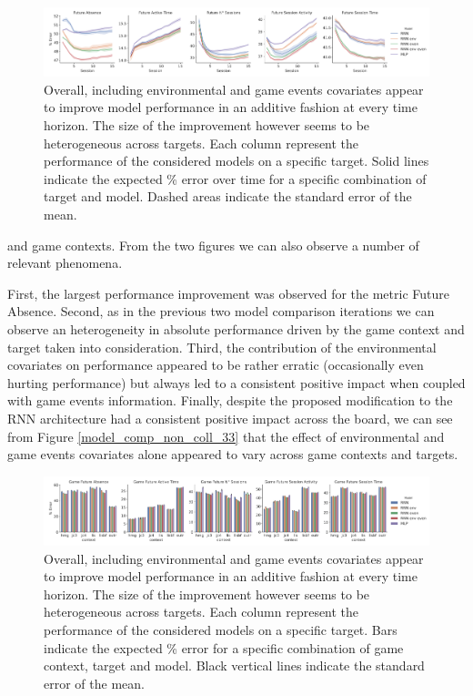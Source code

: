 \begin{figure}[h]
\centering
\includegraphics[width=\textwidth]{images/chapter_3/models_comparison_collapsed_game_33.png}
\caption[\textbf{Model comparison collapsing over game context}]{ Overall, including environmental and game events covariates appear to improve model performance in an additive fashion at every time horizon. The size of the improvement however seems to be heterogeneous across targets. Each column represent the performance of the considered models on a specific target. Solid lines indicate the expected \% error over time for a specific combination of target and model. Dashed areas indicate the standard error of the mean.}
\label{model_comp_coll_game_33}
\end{figure}

and game contexts. From the two figures we can also observe a number of relevant phenomena. 

First, the largest performance improvement was observed for the metric Future Absence. Second, as in the previous two model comparison iterations we can observe an heterogeneity in absolute performance driven by the game context and target taken into consideration. Third, the contribution of the environmental covariates on performance appeared to be rather erratic (occasionally even hurting performance) but always led to a consistent positive impact when coupled with game events information. Finally, despite the proposed modification to the RNN architecture had a consistent positive impact across the board, we can see from Figure \ref{model_comp_non_coll_33} that the effect of environmental and game events covariates alone appeared to vary across game contexts and targets.

\begin{figure}[h]
\centering
\includegraphics[width=\textwidth]{images/chapter_3/models_comparison_collapsed_time_33.png}
\caption[\textbf{Model comparison collapsing over time}]{Overall, including environmental and game events covariates appear to improve model performance in an additive fashion at every time horizon. The size of the improvement however seems to be heterogeneous across targets. Each column represent the performance of the considered models on a specific target. Bars indicate the expected \% error for a specific combination of game context, target and model. Black vertical lines indicate the standard error of the mean.}
\label{model_comp_coll_time_33} 
\end{figure}

